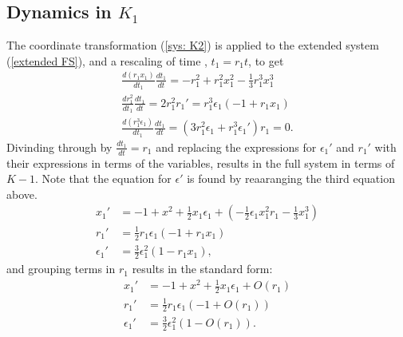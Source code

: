 \subsection{Dynamics in \texorpdfstring{$K_1$}{K1}}\label{sec:dynamics-in-texorpdfstringk1k1} 
The coordinate transformation (\ref{sys: K2}) is applied to the extended system (\ref{extended FS}), and a rescaling of time , $t_1=r_1t$, to get
\begin{align*}
\frac{d(r_1x_1)}{dt_1} \frac{dt_1}{dt} = -r_1^2 + r_1^2x_1^2 - \frac{1}{3}r_1^3x_1^3\\
\frac{dr_1^2}{dt_1}\frac{dt_1}{dt}= 2r_1^2r_1' = r_1^3 \epsilon_1 (-1 +r_1 x_1)\\
\frac{d(r_1^3 \epsilon_1)}{dt_1}\frac{dt_1}{dt}= (3r_1^2\epsilon_1 + r_1^3 \epsilon_1') r_1 = 0.
\end{align*}
Divinding through by $\frac{dt_1}{dt}=r_1$ and replacing the expressions for $\epsilon_1'$ and $r_1'$ with their expressions in terms of the variables, results in the full system in terms of $K-1$. Note that the equation for $\epsilon'$ is found by reaaranging the third equation above. 
\begin{align*}
x_1' &= -1 +x^2 + \frac{1}{2} x_1 \epsilon_1 + \left( - \frac{1}{2} \epsilon_1 x_1^2r_1 - \frac{1}{3} x_1^3 \right)\\
r_1' &= \frac{1}{2} r_1 \epsilon_1( -1 + r_1 x_1)\\
\epsilon_1' &= \frac{3}{2} \epsilon_1^2 ( 1- r_1x_1),
\end{align*}
and grouping terms in $r_1$ results in the standard form:
\begin{align} \label{K1systemfull}
x_1' &= -1 +x^2 + \frac{1}{2} x_1 \epsilon_1 +O(r_1)\\
r_1' &= \frac{1}{2} r_1 \epsilon_1( -1 + O(r_1))\\
\epsilon_1' &= \frac{3}{2} \epsilon_1^2 ( 1- O(r_1)).
\end{align}

